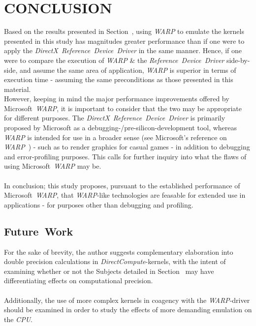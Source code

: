 \documentclass[a4paper,twocolumn,10pt]{article}
\begin{document}
\section{CONCLUSION}
\label{sec:conclusion}
Based on the results presented in Section~, using \textit{WARP} to emulate the kernels presented in this study has magnitudes greater performance than if one were to apply the \textit{DirectX}~\textit{Reference~Device~Driver} in the same manner. Hence, if one were to compare the execution of \textit{WARP} \& the \textit{Reference~Device~Driver} side-by-side, and assume the same area of application, \textit{WARP} is superior in terms of execution time - assuming the same preconditions as those presented in this material.\\
However, keeping in mind the major performance improvements offered by Microsoft~\textit{WARP}, it is important to consider that the two may be appropriate for different purposes. The \textit{DirectX}~\textit{Reference~Device~Driver} is primarily proposed by Microsoft as a debugging-/pre-silicon-development tool, whereas \textit{WARP} is intended for use in a broader sense (see Microsoft's reference on \textit{WARP}~) - such as to render graphics for casual games - in addition to debugging and error-profiling purposes. This calls for further inquiry into what the flaws of using Microsoft~\textit{WARP} may be.\\
\\
In conclusion; this study proposes, pursuant to the established performance of Microsoft~\textit{WARP}, that \textit{WARP}-like technologies are feasable for extended use in applications - for purposes other than debugging and profiling.

\subsection{Future~Work}
\label{sec:conclusion:futurework}
For the sake of brevity, the author suggests complementary elaboration into double precision calculations in \textit{DirectCompute}-kernels, with the intent of examining whether or not the Subjects detailed in Section~ may have differentiating effects on computational precision.\\
\\
Additionally, the use of more complex kernels in coagency with the \textit{WARP}-driver should be examined in order to study the effects of more demanding emulation on the \textit{CPU}.
\end{document}
